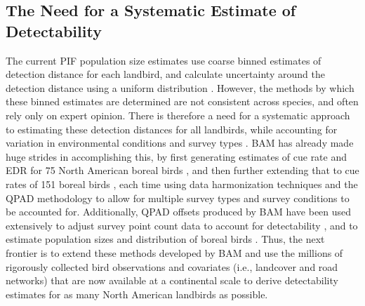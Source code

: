 \subsection{The Need for a Systematic Estimate of Detectability}
\par The current PIF population size estimates use coarse binned estimates of detection distance for each landbird, and calculate uncertainty around the detection distance using a uniform distribution \citep{stanton_estimating_2019, will_handbook_2020}. However, the methods by which these binned estimates are determined are not consistent across species, and often rely only on expert opinion. There is therefore a need for a systematic approach to estimating these detection distances for all landbirds, while accounting for variation in environmental conditions and survey types \citep{stanton_estimating_2019, will_handbook_2020}. BAM has already made huge strides in accomplishing this, by first generating estimates of cue rate and EDR for 75 North American boreal birds \citep{solymos_calibrating_2013}, and then further extending that to cue rates of 151 boreal birds \citep{solymos_evaluating_2018}, each time using data harmonization techniques \citep{barker_ecological_2015} and the QPAD methodology \citep{solymos_calibrating_2013} to allow for multiple survey types and survey conditions to be accounted for. Additionally, QPAD offsets produced by BAM have been used extensively to adjust survey point count data to account for detectability \citep{hobson_long-term_2019, zlonis_burn_2019, knaggs_avian_2020, leston_quantifying_2020}, and to estimate population sizes and distribution of boreal birds \citep{crosby_differential_2019, solymos_lessons_2020}. Thus, the next frontier is to extend these methods developed by BAM and use the millions of rigorously collected bird observations and covariates (i.e., landcover and road networks) that are now available at a continental scale to derive detectability estimates for as many North American landbirds as possible.

